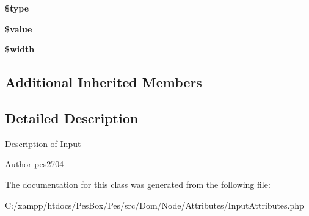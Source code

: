 \begin{DoxyCompactItemize}
\mbox{\label{class_pes_1_1_dom_1_1_node_1_1_attributes_1_1_input_attributes_a9a4a6fba2208984cabb3afacadf33919}} 
{\bfseries \$type}
\item 
\mbox{\label{class_pes_1_1_dom_1_1_node_1_1_attributes_1_1_input_attributes_a0f298096f322952a72a50f98a74c7b60}} 
{\bfseries \$value}
\item 
\mbox{\label{class_pes_1_1_dom_1_1_node_1_1_attributes_1_1_input_attributes_a5795120b4b324bc4ca83f1e6fdce7d57}} 
{\bfseries \$width}
\end{DoxyCompactItemize}
\subsection*{Additional Inherited Members}


\subsection{Detailed Description}
Description of Input

\begin{DoxyAuthor}{Author}
pes2704 
\end{DoxyAuthor}


The documentation for this class was generated from the following file\+:\begin{DoxyCompactItemize}
\item 
C\+:/xampp/htdocs/\+Pes\+Box/\+Pes/src/\+Dom/\+Node/\+Attributes/Input\+Attributes.\+php\end{DoxyCompactItemize}
